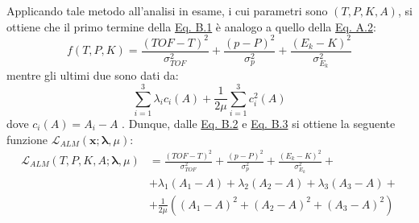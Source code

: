 \documentclass[12pt,a4paper,twoside]{report}
\newcommand{\vect}[1]{\boldsymbol{#1}}
\begin{document}
\begin{appendices}
		Applicando tale metodo all'analisi in esame, i cui parametri sono $\left(T,P,K,A\right)$, si ottiene che il primo termine della \hyperref[eq:augmented_lagrangian_funct]{Eq. B.1} è analogo a quello della \hyperref[eq:chi_square]{Eq. A.2}:
		\begin{equation}
			f\left(T,P,K\right)=\frac{\left(TOF-T\right)^2}{\sigma^2_{TOF}}+\frac{\left(p-P\right)^2}{\sigma^2_{p}}+\frac{\left(E_k-K\right)^2}{\sigma^2_{E_k}}
			\label{eq:first_term_ALM}
		\end{equation}
		mentre gli ultimi due sono dati da:
		\begin{equation}
			\sum_{i=1}^{3}\lambda_ic_i\left(A\right)+\frac{1}{2\mu}\sum_{i=1}^{3}c_i^2\left(A\right)
			\label{eq:other_terms_ALM}
		\end{equation}
		dove $c_i\left(A\right)=A_i-A$ \cite{valle2019design}. Dunque, dalle \hyperref[eq:first_term_ALM]{Eq. B.2} e \hyperref[eq:other_terms_ALM]{Eq. B.3} si ottiene la seguente funzione $\mathcal{L}_{ALM}\left(\vect{x};\vect{\lambda},\mu\right)$:
		\begin{equation}
			\begin{aligned}
				\mathcal{L}_{ALM}\left(T,P,K,A;\vect{\lambda},\mu\right)&=\frac{\left(TOF-T\right)^2}{\sigma^2_{TOF}}+\frac{\left(p-P\right)^2}{\sigma^2_{p}}+\frac{\left(E_k-K\right)^2}{\sigma^2_{E_k}}+\\
				&+\lambda_1\left(A_1-A\right)+\lambda_2\left(A_2-A\right)+\lambda_3\left(A_3-A\right)+\\
				&+\frac{1}{2\mu}\left(\left(A_1-A\right)^2+\left(A_2-A\right)^2+\left(A_3-A\right)^2\right)
			\end{aligned}
			\label{eq:alm_analysis}
		\end{equation}
	\end{appendices}	
	\newpage
	\printbibliography[
		heading=bibintoc,
		title={Bibliografia}
		]
\end{document}
